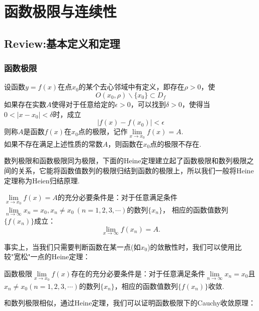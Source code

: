 \chapter{函数极限与连续性}
	\section{Review:基本定义和定理}
	\subsection{函数极限}
	\begin{definition}
		设函数$y=f(x)$在点$x_0$的某个去心邻域中有定义，即存在$\rho>0$，使$$O(x_0,\rho) \backslash \{x_0\}\subset D_{f}$$如果存在实数$A$使得对于任意给定的$\epsilon>0$，可以找到$\delta>0$，使得当$0<|x-x_{0}|<\delta$时，成立$$|f(x)-f(x_0)|<\epsilon$$
		则称$A$是函数$f(x)$在$x_0$点的极限，记作$\lim\limits_{x\rightarrow x_0}f(x)=A$.\\
		如果不存在满足上述性质的常数$A$，则函数在$x_0$点的极限不存在.
	\end{definition}

	数列极限和函数极限同为极限，下面的Heine定理建立起了函数极限和数列极限之间的关系，它能将函数值数列的极限{\heiti 归结到}函数的极限上，所以我们一般将Heine定理称为Heien归结原理.

	\begin{theorem}[Heine归结原理]
		$\lim\limits_{x\rightarrow x_0}f(x)=A$的充分必要条件是：对于任意满足条件$\lim\limits_{n\rightarrow\infty}x_n=x_0,x_n\neq x_0\ (n=1,2,3,\cdots)$的数列$\{x_n\}$，
		相应的函数值数列$\{f(x_n)\}$成立：$$\lim\limits_{x\rightarrow\infty}f(x_n)=A.$$
	\end{theorem}

	事实上，当我们只需要判断函数在某一点(如$x_0$)的敛散性时，我们可以使用比较"宽松"一点的Heine定理：\par
	
	\begin{theorem}
		函数极限$\lim\limits_{x\rightarrow x_0}f(x)$存在的充分必要条件是：对于任意满足条件$\lim\limits_{n\rightarrow\infty}x_n=x_0$且$x_n\neq x_0(n=1,2,3,\cdots)$的数列$\{x_n\}$，相应的函数值数列$\{f(x_n)\}$收敛.
	\end{theorem}

	和数列极限相似，通过Heine定理，我们可以证明函数极限下的Cauchy收敛原理：
	
